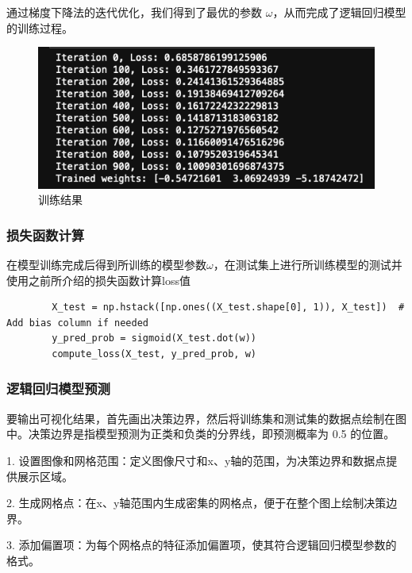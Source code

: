 \documentclass[12pt,a4paper,oneside]{article}
\begin{document}
    通过梯度下降法的迭代优化，我们得到了最优的参数 $\omega$，从而完成了逻辑回归模型的训练过程。

    \begin{figure}[H]
        \centering
        \begin{minipage}{0.4\textwidth}
            \centering
            \includegraphics[width=\textwidth]{image/3} %
            \caption{训练结果}
            \label{fig:image3}
        \end{minipage}
    \end{figure}
    \subsubsection{损失函数计算}
    在模型训练完成后得到所训练的模型参数$\omega$，在测试集上进行所训练模型的测试并使用之前所介绍的损失函数计算loss值

    \begin{lstlisting} 
        X_test = np.hstack([np.ones((X_test.shape[0], 1)), X_test])  # Add bias column if needed
        y_pred_prob = sigmoid(X_test.dot(w))
        compute_loss(X_test, y_pred_prob, w)
    \end{lstlisting}

    \subsubsection{逻辑回归模型预测}
    \qquad 要输出可视化结果，首先画出决策边界，然后将训练集和测试集的数据点绘制在图中。决策边界是指模型预测为正类和负类的分界线，即预测概率为 0.5 的位置。
    
    1.	设置图像和网格范围：定义图像尺寸和x、y轴的范围，为决策边界和数据点提供展示区域。
	
    2.	生成网格点：在x、y轴范围内生成密集的网格点，便于在整个图上绘制决策边界。
	
    3.	添加偏置项：为每个网格点的特征添加偏置项，使其符合逻辑回归模型参数的格式。
	
\end{document}
